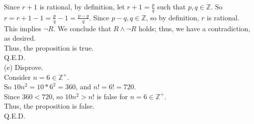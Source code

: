 \documentclass{article}
\begin{document}
Since $r + 1$ is rational, by definition, let $r + 1 = \frac{p}{q}$ such that $p,q\in\mathbb{Z}$. So $r = r + 1 - 1 = \frac{p}{q} - 1 = \frac{p - q}{q}$. Since $p - q, q\in\mathbb{Z}$, so by definition, $r$ is rational.\\[.1cm]
\indent This implies $\neg R$. We conclude that $R\land\neg R$ holds; thus, we have a contradiction, as desired.\\[.1cm]
\indent Thus, the proposition is true.\\[.1cm]
\indent Q.E.D.\\[.15cm]
(e) Disprove.\\[.15cm]
\indent Consider $n = 6\in\mathbb{Z^+}$.\\[.1cm]
\indent So $10n^2 = 10*6^2 = 360$, and $n! = 6! = 720$.\\[.1cm]
\indent Since $360 < 720$, so $10n^2 > n!$ is false for $n = 6\in\mathbb{Z^+}$.\\[.1cm]
\indent Thus, the proposition is false.\\[.1cm]
\indent Q.E.D.
\end{document}
